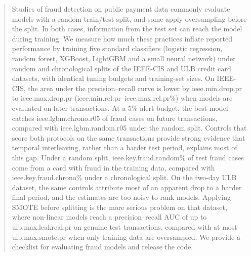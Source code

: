 \begin{abstract}
Studies of fraud detection on public payment data commonly evaluate models with a random train/test split, and some apply oversampling before the split. In both cases, information from the test set can reach the model during training. We measure how much these practices inflate reported performance by training five standard classifiers (logistic regression, random forest, XGBoost, LightGBM and a small neural network) under random and chronological splits of the IEEE-CIS and ULB credit card datasets, with identical tuning budgets and training-set sizes. On IEEE-CIS, the area under the precision--recall curve is lower by \num{ieee.min.drop.pr} to \num{ieee.max.drop.pr} (\num{ieee.min.rel.pr}--\num{ieee.max.rel.pr}\%) when models are evaluated on later transactions. At a 5\% alert budget, the best model catches \num{ieee.lgbm.chrono.r05} of fraud cases on future transactions, compared with \num{ieee.lgbm.random.r05} under the random split. Controls that score both protocols on the same transactions provide strong evidence that temporal interleaving, rather than a harder test period, explains most of this gap. Under a random split, \num{ieee.key.fraud.random}\% of test fraud cases come from a card with fraud in the training data, compared with \num{ieee.key.fraud.chrono}\% under a chronological split. On the two-day ULB dataset, the same controls attribute most of an apparent drop to a harder final period, and the estimates are too noisy to rank models. Applying SMOTE before splitting is the more serious problem on that dataset, where non-linear models reach a precision--recall AUC of up to \num{ulb.max.leakreal.pr} on genuine test transactions, compared with at most \num{ulb.max.smote.pr} when only training data are oversampled. We provide a checklist for evaluating fraud models and release the code.
\end{abstract}
